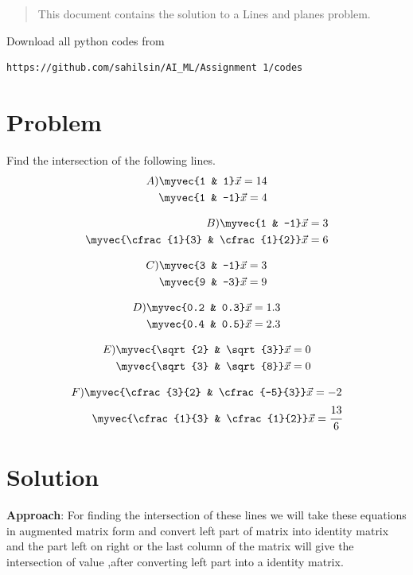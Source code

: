 
\begin{abstract}
This document contains the solution to a Lines and planes problem.
\end{abstract}
Download all python codes from 
%
\begin{lstlisting}
https://github.com/sahilsin/AI_ML/Assignment 1/codes
\end{lstlisting}

\section{Problem}
Find the intersection of the following lines.
\begin{align}
A)
\myvec{1  &  1}\vec{x}=14\\
\myvec{1 & -1}\vec{x}=4\\
\end{align}

\begin{align}
B)
\myvec{1  &  -1}\vec{x}=3\\
\myvec{\cfrac{1}{3} & \cfrac{1}{2}}\vec{x}=6\\
\end{align}

\begin{align}
C)
\myvec{3  &  -1}\vec{x}=3\\
\myvec{9 & -3}\vec{x}=9\\
\end{align}

\begin{align}
D)
\myvec{0.2  &  0.3}\vec{x}=1.3\\
\myvec{0.4 & 0.5}\vec{x}=2.3\\
\end{align}

\begin{align}
E)
\myvec{\sqrt{2}  &  \sqrt{3}}\vec{x}=0\\
\myvec{\sqrt{3} & \sqrt{8}}\vec{x}=0\\
\end{align}

\begin{align}
F)
\myvec{\cfrac{3}{2}  &  \cfrac{-5}{3}}\vec{x}=-2\\
\myvec{\cfrac{1}{3} & \cfrac{1}{2}}\vec{x}=\cfrac{13}{6}\\
\end{align}

%
%
\section{Solution}
\begin{flushleft}
\textbf{Approach}: For finding the intersection of these lines we will take these equations in augmented matrix form and convert left part of matrix into identity matrix and the part left on right or the last column of the matrix will give the intersection of value ,after converting left part into a identity matrix. 
\end{flushleft}


